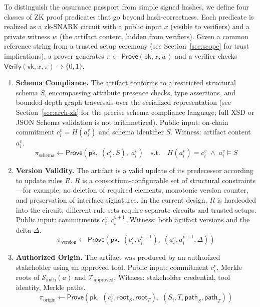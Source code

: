 To distinguish the assurance passport from simple signed hashes, we define four classes of ZK proof predicates that go beyond hash-correctness.
Each predicate is realized as a zk-SNARK circuit with a public input $x$ (visible to verifiers) and a private witness $w$ (the artifact content, hidden from verifiers).
Given a common reference string from a trusted setup ceremony (see Section~\ref{sec:scope} for trust implications), a prover generates $\pi \leftarrow \textsf{Prove}(\mathsf{pk}, x, w)$ and a verifier checks $\textsf{Verify}(\mathsf{vk}, x, \pi) \rightarrow \{0, 1\}$.

\begin{enumerate}
    \item \textbf{Schema Compliance.} The artifact conforms to a restricted structural schema $S$, encompassing attribute presence checks, type assertions, and bounded-depth graph traversals over the serialized representation (see Section~\ref{sec:arch-zk} for the precise schema compliance language; full XSD or JSON Schema validation is not arithmetized).
    Public input: on-chain commitment $c_i^{v} = H(a_i^{v})$ and schema identifier $S$. Witness: artifact content $a_i^{v}$.
    \begin{equation}
    \label{eq:schema}
    \pi_{\text{schema}} \leftarrow \textsf{Prove}\!\left(\mathsf{pk},\; (c_i^{v}, S),\; a_i^{v}\right) \quad \text{s.t.} \quad H(a_i^{v}) = c_i^{v} \;\wedge\; a_i^{v} \models S
    \end{equation}

    \item \textbf{Version Validity.} The artifact is a valid update of its predecessor according to update rules $R$.
    $R$ is a consortium-configurable set of structural constraints---for example, no deletion of required elements, monotonic version counter, and preservation of interface signatures.
    In the current design, $R$ is hardcoded into the circuit; different rule sets require separate circuits and trusted setups.
    Public input: commitments $c_i^{v}, c_i^{v+1}$. Witness: both artifact versions and the delta $\Delta$.
    \begin{equation}
    \label{eq:version}
    \pi_{\text{version}} \leftarrow \textsf{Prove}\!\left(\mathsf{pk},\; (c_i^{v}, c_i^{v+1}),\; (a_i^{v}, a_i^{v+1}, \Delta)\right)
    \end{equation}

    \item \textbf{Authorized Origin.} The artifact was produced by an authorized stakeholder using an approved tool.
    Public input: commitment $c_i^{v}$, Merkle roots of $\mathcal{S}_{\text{auth}}(a)$ and $\mathcal{T}_{\text{approved}}$. Witness: stakeholder credential, tool identity, Merkle paths.
    \begin{equation}
    \label{eq:origin}
    \pi_{\text{origin}} \leftarrow \textsf{Prove}\!\left(\mathsf{pk},\; (c_i^{v}, \mathsf{root}_S, \mathsf{root}_T),\; (S_i, T, \mathsf{path}_S, \mathsf{path}_T)\right)
    \end{equation}


\end{enumerate}
